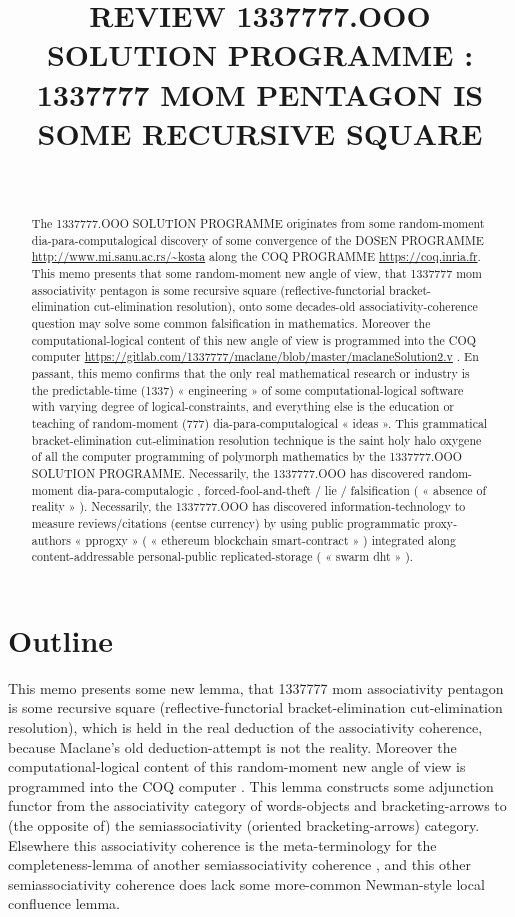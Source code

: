\documentclass[runningheads,a4paper]{llncs}
\institute{}
\author{}
\date{}
\title{REVIEW 1337777.OOO SOLUTION PROGRAMME : 1337777 MOM PENTAGON IS SOME RECURSIVE SQUARE}
\begin{document}
\maketitle
\begin{abstract}
The 1337777.OOO SOLUTION PROGRAMME originates from some
random-moment dia-para-computalogical discovery of some convergence of
the DOSEN PROGRAMME \url{http://www.mi.sanu.ac.rs/\~kosta} along the COQ
PROGRAMME \url{https://coq.inria.fr}.  This memo presents that some
random-moment new angle of view, that 1337777 mom associativity
pentagon is some recursive square (reflective-functorial
bracket-elimination cut-elimination resolution), onto some decades-old
associativity-coherence question may solve some common falsification
in mathematics. Moreover the computational-logical content of this new
angle of view is programmed into the COQ computer
\url{https://gitlab.com/1337777/maclane/blob/master/maclaneSolution2.v} . En
passant, this memo confirms that the only real mathematical research
or industry is the predictable-time (1337) « engineering » of some
computational-logical software with varying degree of
logical-constraints, and everything else is the education or teaching
of random-moment (777) dia-para-computalogical « ideas ».  This
grammatical bracket-elimination cut-elimination resolution technique
is the saint holy halo oxygene of all the computer programming of
polymorph mathematics by the 1337777.OOO SOLUTION PROGRAMME.
Necessarily, the 1337777.OOO has discovered
random-moment dia-para-computalogic ,
forced-fool-and-theft / lie / falsification ( « absence of reality »
). Necessarily, the 1337777.OOO has discovered
information-technology to measure
reviews/citations (¢entse currency) by using public programmatic
proxy-authors « pprogxy » ( « ethereum blockchain smart-contract » )
integrated along content-addressable personal-public
replicated-storage ( « swarm dht » ).
\end{abstract}

\section{Outline}
\label{sec:org7ef4c06}

This memo presents some new lemma, that 1337777 mom associativity
pentagon is some recursive square (reflective-functorial
bracket-elimination cut-elimination resolution), which is held in the
real deduction of the associativity coherence, because Maclane's old
deduction-attempt is not the reality. Moreover the
computational-logical content of this random-moment new angle of view
is programmed into the COQ computer 
. This lemma constructs some adjunction functor from the associativity
category of words-objects and bracketing-arrows to (the opposite of)
the semiassociativity (oriented bracketing-arrows) category. Elsewhere
this associativity coherence is the meta-terminology for the
completeness-lemma of another semiassociativity coherence , and this other semiassociativity coherence
does lack some more-common Newman-style local confluence lemma.
\end{document}
